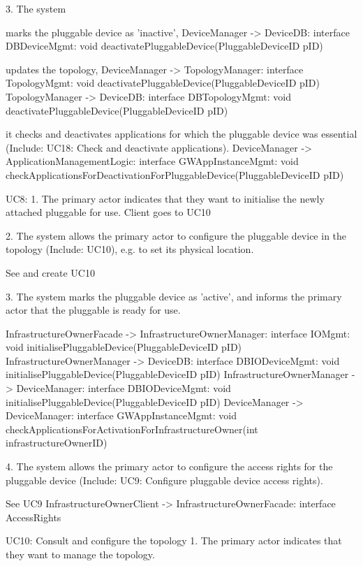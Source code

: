         3. The system
           { marks the pluggable device as 'inactive',
            DeviceManager -> DeviceDB: interface DBDeviceMgmt: void deactivatePluggableDevice(PluggableDeviceID pID)

           { updates the topology,
            DeviceManager -> TopologyManager: interface TopologyMgmt: void deactivatePluggableDevice(PluggableDeviceID pID)
            TopologyManager -> DeviceDB: interface DBTopologyMgmt: void deactivatePluggableDevice(PluggableDeviceID pID)

           { it checks and deactivates applications for which the pluggable device was essential (Include: UC18: Check and deactivate applications).
            DeviceManager -> ApplicationManagementLogic: interface GWAppInstanceMgmt: void checkApplicationsForDeactivationForPluggableDevice(PluggableDeviceID pID)


    UC8:
        1. The primary actor indicates that they want to initialise the newly attached pluggable for use.
            Client goes to UC10

        2. The system allows the primary actor to configure the pluggable device in the topology (Include: UC10), e.g. to set its physical location.

            See and create UC10

        3. The system marks the pluggable device as 'active', and informs the primary actor that the pluggable is ready for use.

            InfrastructureOwnerFacade -> InfrastructureOwnerManager: interface IOMgmt: void initialisePluggableDevice(PluggableDeviceID pID)
            InfrastructureOwnerManager -> DeviceDB: interface DBIODeviceMgmt: void initialisePluggableDevice(PluggableDeviceID pID)
            InfrastructureOwnerManager -> DeviceManager: interface DBIODeviceMgmt: void initialisePluggableDevice(PluggableDeviceID pID)
            DeviceManager -> DeviceManager: interface GWAppInstanceMgmt: void checkApplicationsForActivationForInfrastructureOwner(int infrastructureOwnerID)

        4. The system allows the primary actor to configure the access rights for the pluggable device (Include: UC9: Configure pluggable device access rights).

            See UC9
            InfrastructureOwnerClient -> InfrastructureOwnerFacade: interface AccessRights


    UC10: Consult and configure the topology
        1. The primary actor indicates that they want to manage the topology.

}}}
